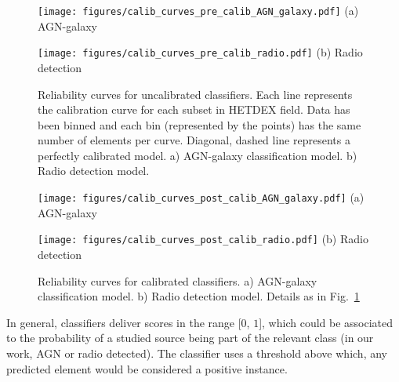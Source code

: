 \documentclass{aa}
\begin{document}
\begin{appendix}
\begin{figure}
  \centering
  \begin{minipage}{0.23\textwidth}
    \centering
    \texttt{[image: figures/calib\_curves\_pre\_calib\_AGN\_galaxy.pdf]}\hfill\break%
    {(a) AGN-galaxy}
  \end{minipage}
  \hfill 
  \begin{minipage}{0.23\textwidth}
    \centering
    \texttt{[image: figures/calib\_curves\_pre\_calib\_radio.pdf]}\hfill\break%
    {(b) Radio detection}
  \end{minipage}
  \caption{Reliability curves for uncalibrated classifiers. Each line represents the calibration curve for each subset in HETDEX field. Data has been binned and each bin (represented by the points) has the same number of elements per curve. Diagonal, dashed line represents a perfectly calibrated model. a) AGN-galaxy classification model. b) Radio detection model.}
  \label{fig:calibration_curves_classification_pre}
\end{figure}

\begin{figure}
  \centering
  \begin{minipage}{0.23\textwidth}
    \centering
    \texttt{[image: figures/calib\_curves\_post\_calib\_AGN\_galaxy.pdf]}\hfill\break%
    {(a) AGN-galaxy}
  \end{minipage}
  \hfill 
  \begin{minipage}{0.23\textwidth}
    \centering
    \texttt{[image: figures/calib\_curves\_post\_calib\_radio.pdf]}\hfill\break%
    {(b) Radio detection}
  \end{minipage}
  \caption{Reliability curves for calibrated classifiers. a) AGN-galaxy classification model. b) Radio detection model. Details as in Fig.~\ref{fig:calibration_curves_classification_pre}}
  \label{fig:calibration_curves_classification_post}
\end{figure}

In general, classifiers deliver scores in the range [$0$, $1$], which could be associated to the probability of a studied source being part of the relevant class (in our work, AGN or radio detected). The classifier uses a threshold above which, any predicted element would be considered a positive instance. 


\end{appendix}
\end{document}
